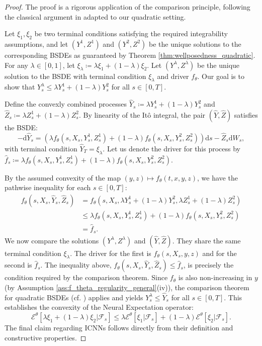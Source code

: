 \documentclass[qian]{imsart}
\newcommand{\Fcal}{\mathcal{F}}
\newcommand{\cEneutheta}{\mathcal{E}^{\theta}}
\newcommand{\dd}{\mathrm{d}}
\theoremstyle{plain}
\theoremstyle{definition}
\begin{document}
\begin{proof}
The proof is a rigorous application of the comparison principle, following the classical argument in \cite{ElKarouiPengQuenez1997} adapted to our quadratic setting.

Let $\xi_1, \xi_2$ be two terminal conditions satisfying the required integrability assumptions, and let $(Y^1, Z^1)$ and $(Y^2, Z^2)$ be the unique solutions to the corresponding BSDEs as guaranteed by Theorem \ref{thm:wellposedness_quadratic}. For any $\lambda \in [0,1]$, let $\xi_\lambda \coloneqq \lambda \xi_1 + (1-\lambda)\xi_2$. Let $(Y^\lambda, Z^\lambda)$ be the unique solution to the BSDE with terminal condition $\xi_\lambda$ and driver $f_\theta$. Our goal is to show that $Y^\lambda_s \le \lambda Y^1_s + (1-\lambda)Y^2_s$ for all $s \in [0,T]$.

Define the convexly combined processes $\hat{Y}_s \coloneqq \lambda Y^1_s + (1-\lambda)Y^2_s$ and $\hat{Z}_s \coloneqq \lambda Z^1_s + (1-\lambda)Z^2_s$. By linearity of the Itô integral, the pair $(\hat{Y}, \hat{Z})$ satisfies the BSDE:
\[ - \dd \hat{Y}_s = \left( \lambda f_\theta(s, X_s, Y^1_s, Z^1_s) + (1-\lambda)f_\theta(s, X_s, Y^2_s, Z^2_s) \right) \dd s - \hat{Z}_s \dd W_s, \]
with terminal condition $\hat{Y}_T = \xi_\lambda$. Let us denote the driver for this process by $\hat{f}_s \coloneqq \lambda f_\theta(s, X_s, Y^1_s, Z^1_s) + (1-\lambda)f_\theta(s, X_s, Y^2_s, Z^2_s)$.

By the assumed convexity of the map $(y,z) \mapsto f_\theta(t,x,y,z)$, we have the pathwise inequality for each $s \in [0,T]$:
\begin{align*}
f_\theta(s, X_s, \hat{Y}_s, \hat{Z}_s) &= f_\theta(s, X_s, \lambda Y^1_s + (1-\lambda)Y^2_s, \lambda Z^1_s + (1-\lambda)Z^2_s) \\
&\le \lambda f_\theta(s, X_s, Y^1_s, Z^1_s) + (1-\lambda) f_\theta(s, X_s, Y^2_s, Z^2_s) \\
&= \hat{f}_s.
\end{align*}
We now compare the solutions $(Y^\lambda, Z^\lambda)$ and $(\hat{Y}, \hat{Z})$. They share the same terminal condition $\xi_\lambda$. The driver for the first is $f_\theta(s,X_s,y,z)$ and for the second is $\hat{f}_s$. The inequality above, $f_\theta(s, X_s, \hat{Y}_s, \hat{Z}_s) \le \hat{f}_s$, is precisely the condition required by the comparison theorem. Since $f_\theta$ is also non-increasing in $y$ (by Assumption \ref{ass:f_theta_regularity_general}(iv)), the comparison theorem for quadratic BSDEs (cf. \cite{Kobylanski2000}) applies and yields $Y^\lambda_s \le \hat{Y}_s$ for all $s \in [0,T]$.
This establishes the convexity of the Neural Expectation operator:
\[ \cEneutheta[\lambda\xi_1 + (1-\lambda)\xi_2 | \Fcal_s] \le \lambda \cEneutheta[\xi_1|\Fcal_s] + (1-\lambda)\cEneutheta[\xi_2|\Fcal_s]. \]
The final claim regarding ICNNs follows directly from their definition and constructive properties.
\end{proof}
\end{document}
